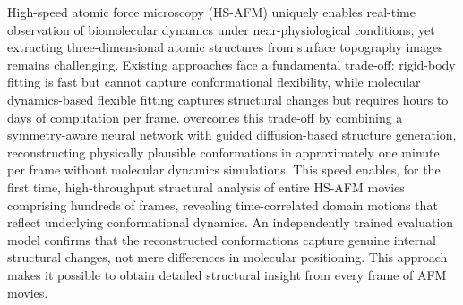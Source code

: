 \begin{sigstatement}
High-speed atomic force microscopy (HS-AFM) uniquely enables real-time observation of biomolecular dynamics under near-physiological conditions, yet extracting three-dimensional atomic structures from surface topography images remains challenging.
Existing approaches face a fundamental trade-off: rigid-body fitting is fast but cannot capture conformational flexibility, while molecular dynamics-based flexible fitting captures structural changes but requires hours to days of computation per frame.
\Model overcomes this trade-off by combining a symmetry-aware neural network with guided diffusion-based structure generation, reconstructing physically plausible conformations in approximately one minute per frame without molecular dynamics simulations.
This speed enables, for the first time, high-throughput structural analysis of entire HS-AFM movies comprising hundreds of frames, revealing time-correlated domain motions that reflect underlying conformational dynamics.
An independently trained evaluation model confirms that the reconstructed conformations capture genuine internal structural changes, not mere differences in molecular positioning.
This approach makes it possible to obtain detailed structural insight from every frame of AFM movies. 
\end{sigstatement}

